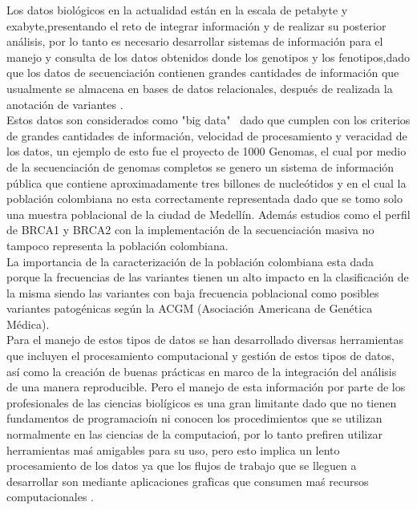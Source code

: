 Los datos biológicos en la actualidad están en la escala de petabyte y exabyte,presentando el reto de integrar información  y de realizar su posterior análisis, por lo tanto es necesario desarrollar sistemas de información para el manejo y consulta de los datos obtenidos donde los genotipos y los fenotipos,dado que los datos de secuenciación contienen grandes cantidades de información que usualmente se almacena en bases de datos relacionales, después de realizada la anotación de variantes \cite{Li2014} \cite{Lauzon2016}.\\

Estos datos son considerados como "big data" \ dado que cumplen con los criterios de grandes cantidades de información, velocidad de procesamiento y veracidad de los datos, un ejemplo de esto fue el proyecto de 1000 Genomas, el cual por medio de la secuenciación de genomas completos se genero un sistema de información pública que contiene aproximadamente tres billones de nucleótidos y en el cual la población colombiana no esta correctamente representada dado que se tomo solo una muestra poblacional de la ciudad de Medellín. Además estudios como el perfil de BRCA1 y BRCA2 con la implementación de la secuenciación masiva no tampoco representa la población  colombiana\cite{Li2014,CoriellInstitute,Arias-blanco2015}.\\
 
La importancia de la caracterización de la población colombiana esta dada porque la frecuencias de las variantes tienen un alto impacto en la clasificación de la misma siendo las variantes con baja frecuencia poblacional como posibles variantes patogénicas según la ACGM (Asociación Americana de Genética Médica)\cite{Li2017}.\\

Para el manejo de estos tipos de datos se han desarrollado diversas herramientas que incluyen el procesamiento computacional y gestión de estos tipos de datos, así como la creación de buenas prácticas en marco de la integración del análisis de una manera reproducible. Pero el manejo de esta informaci\'on por parte de los profesionales de las ciencias biol\'igicos es una gran limitante dado que no tienen fundamentos de programacio\'in ni conocen los procedimientos que se utilizan normalmente en las ciencias de la computacio\'n, por lo tanto prefiren utilizar herramientas ma\'s amigables para su uso, pero esto implica un lento procesamiento de los datos ya que los flujos de trabajo que se lleguen a desarrollar son mediante aplicaciones gra\'ficas que consumen ma\'s recursos computacionales \cite{Fisch2015}.\\

